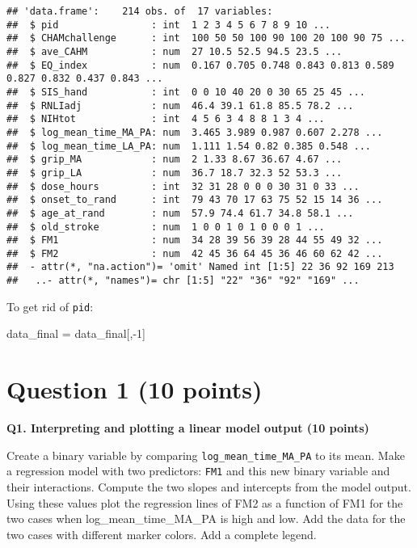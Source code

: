 \documentclass[
]{article}
\newenvironment{Shaded}{\begin{snugshade}}{\end{snugshade}}
\newcommand{\DecValTok}[1]{\textcolor[rgb]{0.00,0.00,0.81}{#1}}
\newcommand{\NormalTok}[1]{#1}
\newcommand{\OtherTok}[1]{\textcolor[rgb]{0.56,0.35,0.01}{#1}}
\newcommand{\SpecialCharTok}[1]{\textcolor[rgb]{0.00,0.00,0.00}{#1}}
\begin{document}
\begin{verbatim}
## 'data.frame':    214 obs. of  17 variables:
##  $ pid                : int  1 2 3 4 5 6 7 8 9 10 ...
##  $ CHAMchallenge      : int  100 50 50 100 90 100 20 100 90 75 ...
##  $ ave_CAHM           : num  27 10.5 52.5 94.5 23.5 ...
##  $ EQ_index           : num  0.167 0.705 0.748 0.843 0.813 0.589 0.827 0.832 0.437 0.843 ...
##  $ SIS_hand           : int  0 0 10 40 20 0 30 65 25 45 ...
##  $ RNLIadj            : num  46.4 39.1 61.8 85.5 78.2 ...
##  $ NIHtot             : int  4 5 6 3 4 8 8 1 3 4 ...
##  $ log_mean_time_MA_PA: num  3.465 3.989 0.987 0.607 2.278 ...
##  $ log_mean_time_LA_PA: num  1.111 1.54 0.82 0.385 0.548 ...
##  $ grip_MA            : num  2 1.33 8.67 36.67 4.67 ...
##  $ grip_LA            : num  36.7 18.7 32.3 52 53.3 ...
##  $ dose_hours         : int  32 31 28 0 0 0 30 31 0 33 ...
##  $ onset_to_rand      : int  79 43 70 17 63 75 52 15 14 36 ...
##  $ age_at_rand        : num  57.9 74.4 61.7 34.8 58.1 ...
##  $ old_stroke         : num  1 0 0 1 0 1 0 0 0 1 ...
##  $ FM1                : num  34 28 39 56 39 28 44 55 49 32 ...
##  $ FM2                : num  42 45 36 64 45 36 46 60 62 42 ...
##  - attr(*, "na.action")= 'omit' Named int [1:5] 22 36 92 169 213
##   ..- attr(*, "names")= chr [1:5] "22" "36" "92" "169" ...
\end{verbatim}

To get rid of \texttt{pid}:

\begin{Shaded}
\begin{Highlighting}[]
\NormalTok{data\_final }\OtherTok{=}\NormalTok{ data\_final[,}\SpecialCharTok{{-}}\DecValTok{1}\NormalTok{]}
\end{Highlighting}
\end{Shaded}

\hypertarget{question-1-10-points}{%
\section{Question 1 (10 points)}\label{question-1-10-points}}

\textbf{Q1. Interpreting and plotting a linear model output (10 points)}

Create a binary variable by comparing \texttt{log\_mean\_time\_MA\_PA}
to its mean. Make a regression model with two predictors: \texttt{FM1}
and this new binary variable and their interactions. Compute the two
slopes and intercepts from the model output. Using these values plot the
regression lines of FM2 as a function of FM1 for the two cases when
log\_mean\_time\_MA\_PA is high and low. Add the data for the two cases
with different marker colors. Add a complete legend.
\end{document}
